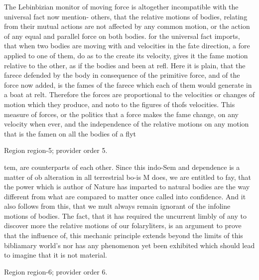 \documentclass[11pt]{article}
\begin{document}
The Lebinbizian monitor of moving force is altogether incompatible with the universal fact now mention- others, that the relative motions of bodies, relating from their mutual actions are not affected by any common motion, or the action of any equal and parallel force on both bodies. for the universal fact imports, that when two bodies are moving with and velocities in the fate direction, a fore applied to one of them, do as to the create its velocity, gives it the fame motion relative to the other, as if the bodies and been at refl. Here it is plain, that the farece defended by the body in consequence of the primitive force, and of the force now added, is the fames of the farece which each of them would generate in a boat at relt. Therefore the forces are proportional to the velocities or changes of motion which they produce, and noto to the figures of thofs velocities. This measure of forces, or the politics that a force makes the fame change, on any velocity when ever, and the independence of the relative motions on any motion that is the famen on all the bodies of a flyt
\par

{\scriptsize\color{gray} Region region-5; provider order 5.\par}
\medskip

tem, are counterparts of each other. Since this indo-Sem and dependence is a matter of ob alteration in all terrestrial bo-is M does, we are entitled to fay, that the power which is author of Nature has imparted to natural bodies are the way different from what are compared to matter once called into confidence. And it also follows from this, that we mult always remain ignorant of the infoline motions of bodies. The fact, that it has required the uncurrent limbly of any to discover more the relative motions of our folaryliters, is an argument to prove that the influence of, this mechanic principle extends beyond the limits of this bibliamary world's nor has any phenomenon yet been exhibited which should lead to imagine that it is not material.
\par

{\scriptsize\color{gray} Region region-6; provider order 6.\par}
\medskip
\end{document}
